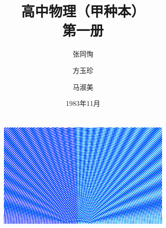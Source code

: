 \documentclass{retypeset}
\begin{document}
	
	
	
	\title{\Huge\bfseries 高中物理（甲种本）\\ 第一册 \vspace*{2cm} }
	\author{\Large 张同恂 \and \Large 方玉珍 \and \Large 马淑美}
	\date{\Large 1983年11月\\~\\~\\ \includegraphics[width=85mm]{fig/A/cover.pdf} }
	
	\maketitle %
	\tableofcontents %
	\frontmatter
	\mainmatter
	
	
	
	
	
\end{document}
